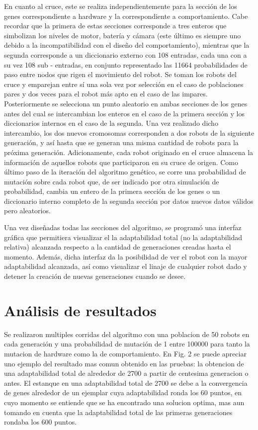 \documentclass[conference]{IEEEtran}
\begin{document}
En cuanto al cruce, este se realiza independientemente para la sección de los genes correspondiente a hardware y la correspondiente a comportamiento. Cabe recordar que la primera de estas secciones corresponde a tres enteros que simbolizan los niveles de motor, batería y cámara (este último es siempre uno debido a la incompatibilidad con el diseño del comportamiento), mientras que la segunda corresponde a un diccionario externo con 108 entradas, cada una con a su vez 108 sub - entradas, en conjunto representado las 11664 probabilidades de paso entre nodos que rigen el movimiento del robot. Se toman los robots del cruce y emparejan entre sí una sola vez por selección en el caso de poblaciones pares y dos veces para el robot más apto en el caso de las impares. Posteriormente se selecciona un punto aleatorio en ambas secciones de los genes antes del cual se intercambian los enteros en el caso de la primera sección y los diccionarios internos en el caso de la segunda. Una vez realizado dicho intercambio, los dos nuevos cromosomas corresponden a dos robots de la siguiente generación, y así hasta que se generan una misma cantidad de robots para la próxima generación. Adicionamente, cada robot originado en el cruce almacena la información de aquellos robots que participaron en su cruce de origen. Como último paso de la iteración del algoritmo genético, se corre una probabilidad de mutación sobre cada robot que, de ser indicado por otra simulación de probabilidad, cambia un entero de la primera sección de los genes o un diccionario interno completo de la segunda sección por datos nuevos datos válidos pero aleatorios.

Una vez diseñadas todas las secciones del algoritmo, se programó una interfaz gráfica que permitiera visualizar el la adaptabilidad total (no la adaptabilidad relativa) alcanzada respecto a la cantidad de generaciones creadas hasta el momento. Además, dicha interfaz da la posibilidad de ver el robot con la mayor adaptabilidad alcanzada, así como visualizar el linaje de cualquier robot dado y detener la creación de nuevas generaciones cuando se desee.

\section{Análisis de resultados}

Se realizaron multiples corridas del algoritmo con una poblacion de 50 robots en cada generación y una probabilidad de mutación de 1 entre 100000 para tanto la mutacion de hardware como la de comportamiento. En Fig. 2 se puede apreciar uno ejemplo del resultado mas comun obtenido en las pruebas: la obtencion de una adaptabilidad total de alrededor de 2700 a partir de centesima generacion o antes. El estanque en una adaptabilidad total de 2700 se debe a la convergencia de genes alrededor de un ejemplar cuya adaptabilidad ronda los 60 puntos, en cuyo momento se entiende que se ha encontrado una solucion optima, mas aun tomando en cuenta que la adaptabilidad total de las primeras generaciones rondaba los 600 puntos.
\end{document}
